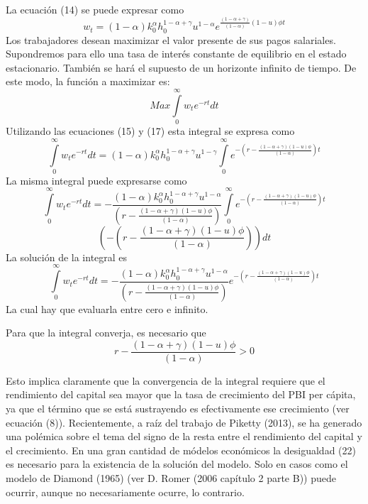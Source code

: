 \documentclass[12pt,notitlepage]{report}
\newcommand{\icis}{{\textstyle\int\limits_0^\infty}w_te^{-rt}dt}
\newcommand{\suma}{(1-\alpha + \gamma)}
\newcommand{\fphi}{\frac{\suma (1-u)\phi}{(1-\alpha)}}
\begin{document}
	La ecuación (14) se puede expresar como
	\begin{equation}\label{ecu17}
		w_t=(1-\alpha)k_0^\alpha h_0^{1-\alpha +\gamma}u^{1-\alpha}e^{\frac{(1-\alpha + \gamma)}{(1-\alpha)}(1-u)\phi t}
	\end{equation} 
	Los trabajadores desean maximizar el valor presente de sus pagos salariales.\\
	Supondremos para ello una tasa de interés constante de equilibrio en el estado estacionario. También se hará el supuesto de un horizonte infinito de tiempo.
	De este modo, la función a maximizar es:
	\begin{equation}\label{ecu18}
		Max\icis
	\end{equation}
	Utilizando las ecuaciones (15) y (17) esta integral se expresa como 
	\begin{equation}\label{ecu19}
		\icis =(1-\alpha)k_0^\alpha h_0^{1-\alpha + \gamma} u^{1-\gamma}\textstyle\int\limits_0^\infty e^{-(r-\fphi)t}
	\end{equation}
	La misma integral puede expresarse como
	\begin{equation}\label{ecu20}
		\icis=-\frac{(1-\alpha)k_0^\alpha h_0^{1-\alpha + \gamma}u^{1-\alpha}}{(r-\fphi)}\textstyle\int\limits_0^\infty e^{-(r-\fphi)t}
	\end{equation}
	$$(-(r-\fphi))dt$$
	La solución de la integral es
	\begin{equation}\label{ecu21}
		\icis =-\frac{(1-\alpha)k_0^\alpha h_0^{1-\alpha + \gamma} u^{1-\alpha}}{(r-\fphi)} e^{-(r-\fphi)t}
	\end{equation}
	La cual hay que evaluarla entre cero e infinito.
	
	Para que la integral converja, es necesario que
	\begin{equation}\label{ecu22}
		r-\fphi >0
	\end{equation}
	
	Esto implica claramente que la convergencia de la integral requiere que el rendimiento del capital sea mayor que la tasa de crecimiento del PBI per cápita, ya que el término que se está sustrayendo es efectivamente ese crecimiento (ver ecuación (8)). Recientemente, a raíz del trabajo de Piketty (2013), se ha generado una polémica sobre el tema del signo de la resta entre el rendimiento del capital y el crecimiento. En una gran cantidad de módelos económicos la desigualdad (22) es necesario para la existencia de la solución del modelo. Solo en casos como el modelo de Diamond (1965) (ver D. Romer (2006 capítulo 2 parte B)) puede ocurrir, aunque no necesariamente ocurre, lo contrario.
	
\end{document}
